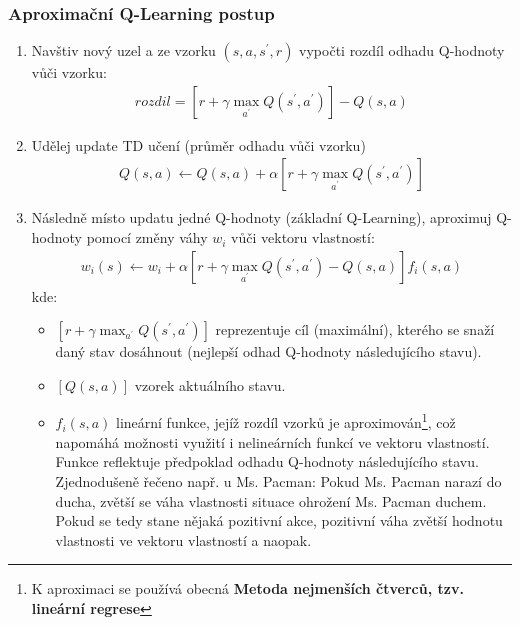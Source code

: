 \subsubsection{Aproximační Q-Learning postup}
\label{teorie:approxq}
\begin{enumerate}
  \item Navštiv nový uzel a ze vzorku $(s,a,s^\prime,r)$ vypočti rozdíl odhadu Q-hodnoty vůči vzorku:
    \begin{align}
	\label{rov:approxq1}
     rozdil = \left [ r + \gamma \max_{a^\prime}Q(s^\prime,a^\prime) \right]  - Q(s,a) 
    \end{align}
  \item Udělej update TD učení (průměr odhadu vůči vzorku)
    \begin{align}
	\label{rov:approxq2}
     Q(s,a) \leftarrow  Q(s,a) + \alpha \left [ r + \gamma \max_{a^\prime}Q(s^\prime,a^\prime) \right]
    \end{align}
  \item Následně místo updatu jedné Q-hodnoty (základní Q-Learning), aproximuj Q-hodnoty pomocí změny váhy $w_i$ vůči vektoru vlastností:
    \begin{align}
	\label{rov:approxq3}
    w_i(s) \leftarrow w_i + \alpha \left [ r + \gamma \max_{a^\prime}Q(s^\prime,a^\prime) - Q(s,a) \right] f_i(s,a)
    \end{align}
    kde:
    \begin{itemize}
      \item $\left [ r + \gamma \max_{a^\prime}Q(s^\prime,a^\prime)\right] $ reprezentuje cíl (maximální), kterého se snaží daný stav dosáhnout (nejlepší odhad Q-hodnoty následujícího stavu).
      \item $\left [ Q(s,a)\right]$ vzorek aktuálního stavu.
      \item $f_i(s,a)$ lineární funkce, jejíž rozdíl vzorků je aproximován\footnote{K aproximaci se používá obecná \textbf{Metoda nejmenších čtverců, tzv. lineární regrese}}, což napomáhá možnosti využití i nelineárních funkcí ve vektoru vlastností. Funkce reflektuje předpoklad odhadu Q-hodnoty následujícího stavu.\newline
      Zjednodušeně řečeno např. u Ms. Pacman: Pokud Ms. Pacman narazí do ducha, zvětší se váha vlastnosti situace ohrožení Ms. Pacman duchem. Pokud se tedy stane nějaká pozitivní akce, pozitivní váha zvětší hodnotu vlastnosti ve vektoru vlastností a naopak.
    \end{itemize}

\end{enumerate}

